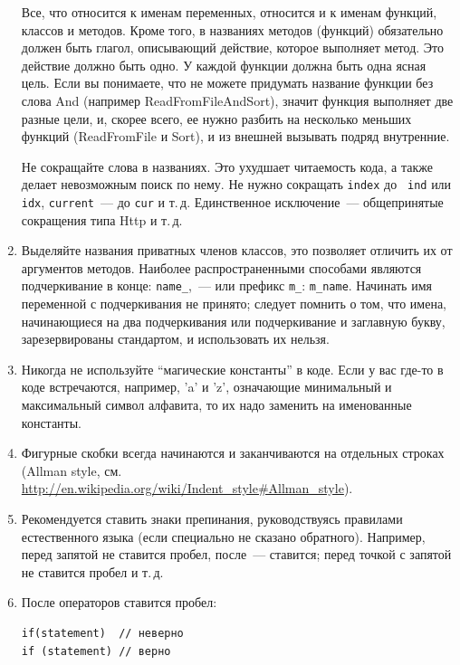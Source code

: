 \documentclass[a4paper,10pt]{article}
\begin{document}
\begin{enumerate}
        Все, что относится к именам переменных, относится и к именам функций,
        классов и методов. Кроме того, в названиях методов (функций) обязательно должен быть глагол, описывающий действие, которое выполняет метод.
        Это действие должно быть одно. У каждой функции должна быть одна ясная
        цель. Если вы понимаете, что не можете придумать название функции без
        слова And (например ReadFromFileAndSort), значит функция выполняет две
        разные цели, и, скорее всего, ее нужно разбить на несколько меньших
        функций (ReadFromFile и Sort), и из внешней вызывать подряд внутренние.
        
        Не сокращайте слова в названиях. Это ухудшает читаемость кода, а также
        делает невозможным поиск по нему. Не нужно сокращать {\tt index} до {\tt
        ind} или {\tt idx}, {\tt current}~— до {\tt cur} и т.\,д. Единственное
        исключение~— общепринятые сокращения типа Http и т.\,д.

    \item Выделяйте названия приватных членов классов, это позволяет отличить их
        от аргументов методов. Наиболее распространенными способами являются
        подчеркивание в конце: {\tt name\_},~— или префикс {\tt m\_}: {\tt m\_name}. Начинать имя
        переменной с подчеркивания не принято; следует помнить о том, что имена,
        начинающиеся на два подчеркивания или подчеркивание и заглавную букву,
        зарезервированы стандартом, и использовать их нельзя.

    \item Никогда не используйте “магические константы” в коде. Если у вас где-то в
        коде встречаются, например, ’a’ и ’z’, означающие минимальный и максимальный символ алфавита, то их надо заменить на именованные константы.

    \item Фигурные скобки всегда начинаются и заканчиваются на отдельных строках
        (Allman style, см.
        \url{http://en.wikipedia.org/wiki/Indent_style#Allman_style}).
    \item Рекомендуется ставить знаки препинания, руководствуясь правилами
        естественного языка (если специально не сказано обратного). Например,
        перед запятой не ставится пробел, после~— ставится; перед точкой с
        запятой не ставится пробел и т.\,д.
    \item После операторов ставится пробел: 
        \begin{lstlisting}
if(statement)  // неверно
if (statement) // верно
        \end{lstlisting}


\end{enumerate}
\end{document}
